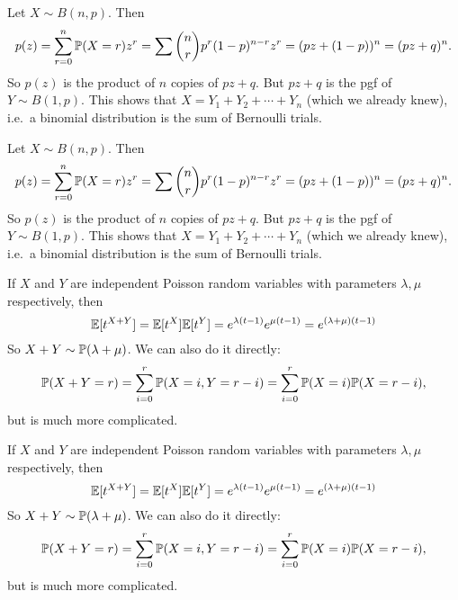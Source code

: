 \begin{note}
  \begin{field}
    \begin{eg}
      Let $X\sim B(n, p)$. Then
      \[
        p(z) = \sum_{r = 0}^{n} \P(X = r)z^r = \sum \binom{n}{r} p^r(1 - p)^{n - r}z^r = (pz + (1 - p))^n = (pz + q)^n.
      \]
      So $p(z)$ is the product of $n$ copies of $pz + q$. But $pz + q$ is the pgf of $Y\sim B(1, p)$.
      This shows that $X = Y_1 + Y_2 + \cdots + Y_n$ (which we already knew), i.e.\ a binomial distribution is the sum of Bernoulli trials.
    \end{eg}
  \end{field}
  \begin{field}
    \begin{eg}
      Let $X\sim B(n, p)$. Then
      \[
        p(z) = \sum_{r = 0}^{n} \P(X = r)z^r = \sum \binom{n}{r} p^r(1 - p)^{n - r}z^r = (pz + (1 - p))^n = (pz + q)^n.
      \]
      So $p(z)$ is the product of $n$ copies of $pz + q$. But $pz + q$ is the pgf of $Y\sim B(1, p)$.
      This shows that $X = Y_1 + Y_2 + \cdots + Y_n$ (which we already knew), i.e.\ a binomial distribution is the sum of Bernoulli trials.
    \end{eg}
  \end{field}
  \xplain{}%
\end{note}

\begin{note}
  \begin{field}
    \begin{eg}
      If $X$ and $Y$ are independent Poisson random variables with parameters $\lambda, \mu$ respectively, then
      \[
        \E[t^{X + Y}] = \E[t^X]\E[t^Y] = e^{\lambda(t - 1)}e^{\mu(t - 1)} = e^{(\lambda + \mu)(t - 1)}
      \]
      So $X + Y\sim \P(\lambda + \mu)$.
      We can also do it directly:
      \[
        \P(X + Y = r) = \sum_{i = 0}^r \P(X = i, Y = r - i) = \sum_{i = 0}^r \P(X = i)\P(X = r - i),
      \]
      but is much more complicated.
    \end{eg}
  \end{field}
  \begin{field}
    \begin{eg}
      If $X$ and $Y$ are independent Poisson random variables with parameters $\lambda, \mu$ respectively, then
      \[
        \E[t^{X + Y}] = \E[t^X]\E[t^Y] = e^{\lambda(t - 1)}e^{\mu(t - 1)} = e^{(\lambda + \mu)(t - 1)}
      \]
      So $X + Y\sim \P(\lambda + \mu)$.
      We can also do it directly:
      \[
        \P(X + Y = r) = \sum_{i = 0}^r \P(X = i, Y = r - i) = \sum_{i = 0}^r \P(X = i)\P(X = r - i),
      \]
      but is much more complicated.
    \end{eg}
  \end{field}
  \xplain{}%
\end{note}

